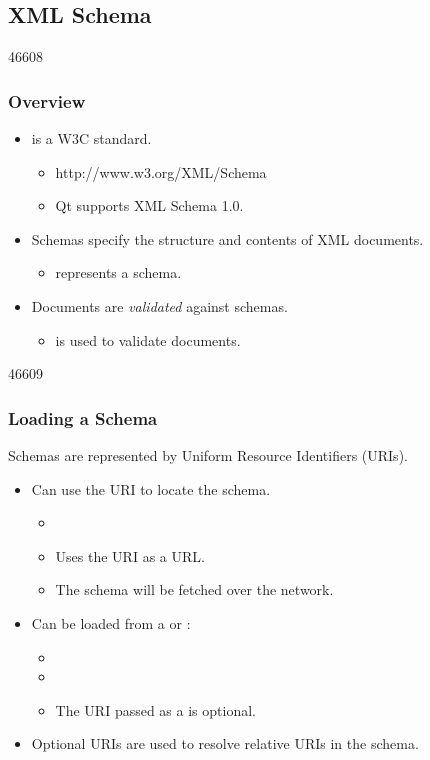 \label{XMLSchema}
\subsection{XML Schema}

\begin{slide}{46608}
\frametitle{Overview}

\begin{itemize}
\item {} is a W3C standard.
  \begin{itemize}
  \item http://www.w3.org/XML/Schema
  \item Qt supports XML Schema 1.0.
  \end{itemize}
\item Schemas specify the structure and contents of XML documents.
  \begin{itemize}
  \item {} represents a schema.
  \end{itemize}
\item Documents are \textit{validated} against schemas.
  \begin{itemize}
  \item {} is used to validate documents.
  \end{itemize}
\end{itemize}

\end{slide}

\begin{slide}{46609}
\frametitle{Loading a Schema}

Schemas are represented by Uniform Resource Identifiers (URIs).

\begin{itemize}
\item Can use the URI to locate the schema.
  \begin{itemize}
  \item {}
  \item Uses the URI as a URL.
  \item The schema will be fetched over the network.
  \end{itemize}
\item Can be loaded from a  or :
  \begin{itemize}
  \item {}
  \item {}
  \item The URI passed as a  is optional.
  \end{itemize}
\item Optional URIs are used to resolve relative URIs in the schema.
\end{itemize}

\end{slide}

